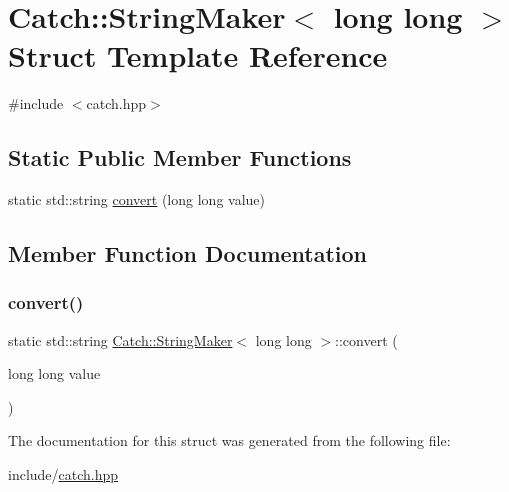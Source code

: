\hypertarget{struct_catch_1_1_string_maker_3_01long_01long_01_4}{}\section{Catch\+::String\+Maker$<$ long long $>$ Struct Template Reference}
\label{struct_catch_1_1_string_maker_3_01long_01long_01_4}


{\ttfamily \#include $<$catch.\+hpp$>$}

\subsection*{Static Public Member Functions}
\begin{DoxyCompactItemize}
\item 
static std\+::string \mbox{\hyperlink{struct_catch_1_1_string_maker_3_01long_01long_01_4_a7a58929dca2a14c576d7d6d08bc615d2}{convert}} (long long value)
\end{DoxyCompactItemize}


\subsection{Member Function Documentation}
\mbox{\label{struct_catch_1_1_string_maker_3_01long_01long_01_4_a7a58929dca2a14c576d7d6d08bc615d2}} 
\subsubsection{\texorpdfstring{convert()}{convert()}}
{\footnotesize\ttfamily static std\+::string \mbox{\hyperlink{struct_catch_1_1_string_maker}{Catch\+::\+String\+Maker}}$<$ long long $>$\+::convert (\begin{DoxyParamCaption}\item[{long long}]{value }\end{DoxyParamCaption})\hspace{0.3cm}{\ttfamily [static]}}



The documentation for this struct was generated from the following file\+:\begin{DoxyCompactItemize}
\item 
include/\mbox{\hyperlink{catch_8hpp}{catch.\+hpp}}\end{DoxyCompactItemize}

